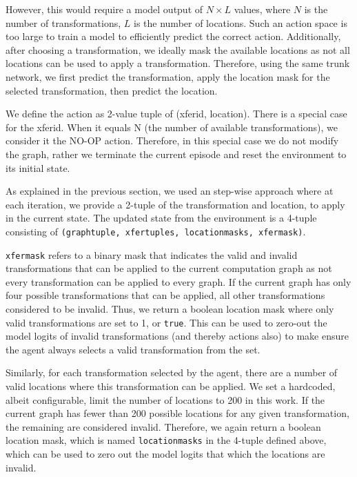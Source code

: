 However, this would require a model output of $N \times L$ values, where $N$ is the number of transformations, $L$ is the number of locations. Such an action space is too large to train a model to efficiently predict the correct action. Additionally, after choosing a transformation, we ideally mask the available locations as not all locations can be used to apply a transformation. Therefore, using the same trunk network, we first predict the transformation, apply the location mask for the selected transformation, then predict the location.

We define the action as 2-value tuple of (xfer\textunderscore id, location). There is a special case for the xfer\textunderscore id. When it equals N (the number of available transformations), we consider it the NO-OP action. Therefore, in this special case we do not modify the graph, rather we terminate the current episode and reset the environment to its initial state.

As explained in the previous section, we used an step-wise approach where at each iteration, we provide a 2-tuple of the transformation and location, to apply in the current state. The updated state from the environment is a 4-tuple consisting of \texttt{(graph\textunderscore tuple, xfer\textunderscore tuples, location\textunderscore masks, xfer\textunderscore mask)}.

\texttt{xfer\textunderscore mask} refers to a binary mask that indicates the valid and invalid transformations that can be applied to the current computation graph as not every transformation can be applied to every graph. If the current graph has only four possible transformations that can be applied, all other transformations considered to be invalid. Thus, we return a boolean location mask where only valid transformations are set to 1, or \texttt{true}. This can be used to zero-out the model logits of invalid transformations (and thereby actions also) to make ensure the agent always selects a valid transformation from the set.

Similarly, for each transformation selected by the agent, there are a number of valid locations where this transformation can be applied. We set a hardcoded, albeit configurable, limit the number of locations to 200 in this work. If the current graph has fewer than 200 possible locations for any given transformation, the remaining are considered invalid. Therefore, we again return a boolean location mask, which is named \texttt{location\textunderscore masks} in the 4-tuple defined above, which can be used to zero out the model logits that which the locations are invalid. 

